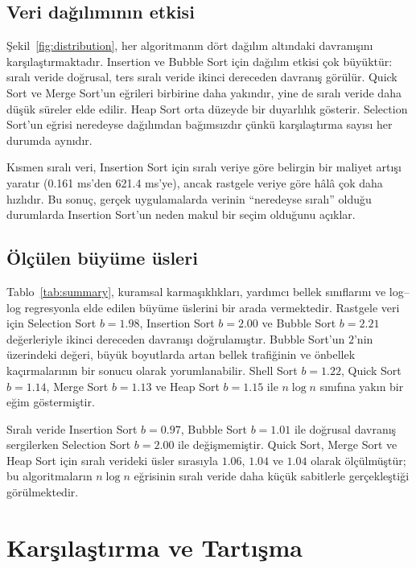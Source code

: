 \documentclass[12pt,a4paper]{article}
\begin{document}
\subsection{Veri dağılımının etkisi}

Şekil~\ref{fig:distribution}, her algoritmanın dört dağılım altındaki davranışını
karşılaştırmaktadır. Insertion ve Bubble Sort için dağılım etkisi çok büyüktür:
sıralı veride doğrusal, ters sıralı veride ikinci dereceden davranış görülür.
Quick Sort ve Merge Sort'un eğrileri birbirine daha yakındır, yine de sıralı
veride daha düşük süreler elde edilir. Heap Sort orta düzeyde bir duyarlılık
gösterir. Selection Sort'un eğrisi neredeyse dağılımdan bağımsızdır çünkü
karşılaştırma sayısı her durumda aynıdır.

Kısmen sıralı veri, Insertion Sort için sıralı veriye göre belirgin bir maliyet
artışı yaratır (0.161 ms'den 621.4 ms'ye), ancak rastgele veriye göre hâlâ çok
daha hızlıdır. Bu sonuç, gerçek uygulamalarda verinin “neredeyse sıralı” olduğu
durumlarda Insertion Sort'un neden makul bir seçim olduğunu açıklar.

\subsection{Ölçülen büyüme üsleri}

Tablo~\ref{tab:summary}, kuramsal karmaşıklıkları, yardımcı bellek sınıflarını ve
log--log regresyonla elde edilen büyüme üslerini bir arada vermektedir.
Rastgele veri için Selection Sort $b = 1.98$, Insertion Sort $b = 2.00$ ve
Bubble Sort $b = 2.21$ değerleriyle ikinci dereceden davranışı doğrulamıştır.
Bubble Sort'un $2$'nin üzerindeki değeri, büyük boyutlarda artan bellek
trafiğinin ve önbellek kaçırmalarının bir sonucu olarak yorumlanabilir. Shell
Sort $b = 1.22$, Quick Sort $b = 1.14$, Merge Sort $b = 1.13$ ve Heap Sort
$b = 1.15$ ile $n \log n$ sınıfına yakın bir eğim göstermiştir.



Sıralı veride Insertion Sort $b = 0.97$, Bubble Sort $b = 1.01$ ile
doğrusal davranış sergilerken Selection Sort $b = 2.00$ ile değişmemiştir.
Quick Sort, Merge Sort ve Heap Sort için sıralı verideki üsler sırasıyla
$1.06$, $1.04$ ve $1.04$ olarak ölçülmüştür; bu algoritmaların $n \log n$
eğrisinin sıralı veride daha küçük sabitlerle gerçekleştiği görülmektedir.

\section{Karşılaştırma ve Tartışma}
\end{document}
